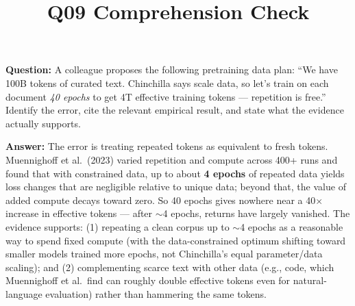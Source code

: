 \documentclass[11pt]{article}
\title{Q09 Comprehension Check}
\date{}
\begin{document}
\maketitle
\textbf{Question:} A colleague proposes the following pretraining data plan: ``We have 100B tokens of curated text. Chinchilla says scale data, so let's train on each document \emph{40 epochs} to get 4T effective training tokens --- repetition is free.'' Identify the error, cite the relevant empirical result, and state what the evidence actually supports.

\vspace{1em}
\textbf{Answer:} The error is treating repeated tokens as equivalent to fresh tokens. Muennighoff et al.\ (2023) varied repetition and compute across 400+ runs and found that with constrained data, up to about \textbf{4 epochs} of repeated data yields loss changes that are negligible relative to unique data; beyond that, the value of added compute decays toward zero. So 40 epochs gives nowhere near a 40$\times$ increase in effective tokens --- after $\sim$4 epochs, returns have largely vanished. The evidence supports: (1) repeating a clean corpus up to $\sim$4 epochs as a reasonable way to spend fixed compute (with the data-constrained optimum shifting toward smaller models trained more epochs, not Chinchilla's equal parameter/data scaling); and (2) complementing scarce text with other data (e.g., code, which Muennighoff et al.\ find can roughly double effective tokens even for natural-language evaluation) rather than hammering the same tokens.
\end{document}
